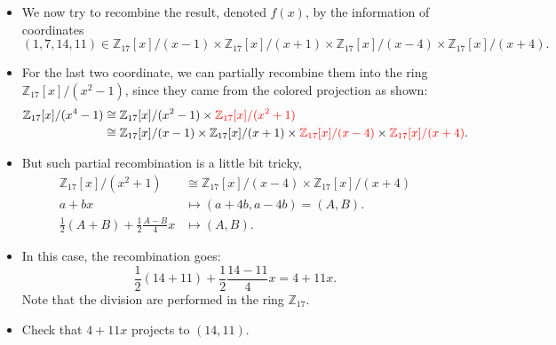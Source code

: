 \begin{frame}
    \begin{itemize}
        \item We now try to recombine the result, denoted \(f(x)\), by the information of coordinates
            \[
            (1, 7, 14, 11)\in 
                \mathbb{Z}_{17}[x]/(x-1) \times 
                \mathbb{Z}_{17}[x]/(x+1) \times 
                \mathbb{Z}_{17}[x]/(x-4) \times 
                \mathbb{Z}_{17}[x]/(x+4).
            \]
        \item For the last two coordinate, we can partially recombine them into the ring 
            \( \mathbb{Z}_{17}[x]/(x^{2}-1) \), since they came from the colored projection as shown:
            \begin{align*}
                \mathbb{Z}_{17}[x]/(x^{4}-1) 
                &\cong 
                \mathbb{Z}_{17}[x]/(x^{2}-1)\times 
                {\color{red}\mathbb{Z}_{17}[x]/(x^{2}+1)}\\
                &\cong 
                \mathbb{Z}_{17}[x]/(x-1) \times 
                \mathbb{Z}_{17}[x]/(x+1) \times 
                {\color{red}\mathbb{Z}_{17}[x]/(x-4)} \times 
                {\color{red}\mathbb{Z}_{17}[x]/(x+4)}.
            \end{align*}
        \item But such partial recombination is a little bit tricky,
            \begin{align*}
                \mathbb{Z}_{17}[x] / (x^{2}+1) &\cong 
                \mathbb{Z}_{17}[x] / (x - 4) \times
                \mathbb{Z}_{17}[x] / (x + 4) \\
                a + bx &\mapsto (a+4b, a-4b) = (A,B).\\
                \frac{1}{2}(A+B) + \frac{1}{2}\frac{A-B}{4}x &\mapsto (A,B).
            \end{align*}
        \item In this case, the recombination goes:
            \[
                \frac{1}{2}(14+11) + \frac{1}{2}\frac{14-11}{4}x = 4 + 11x.
            \]
            Note that the division are performed in the ring \( \mathbb{Z}_{17} \).
        \item Check that \( 4 + 11x \) projects to \( (14, 11)\).
    \end{itemize}
\end{frame}


